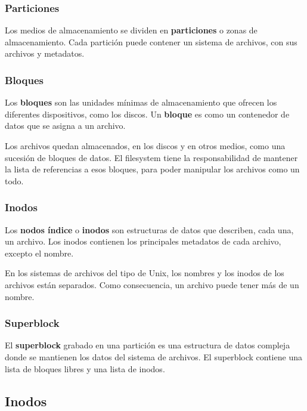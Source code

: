 \documentclass[spanish,a4paper,]{article}
\begin{document}
\hypertarget{particiones}{%
\subsubsection{Particiones}\label{particiones}}

Los medios de almacenamiento se dividen en \textbf{particiones} o zonas
de almacenamiento. Cada partición puede contener un sistema de archivos,
con sus archivos y metadatos.

\hypertarget{bloques}{%
\subsubsection{Bloques}\label{bloques}}

Los \textbf{bloques} son las unidades mínimas de almacenamiento que
ofrecen los diferentes dispositivos, como los discos. Un \textbf{bloque}
es como un contenedor de datos que se asigna a un archivo.

Los archivos quedan almacenados, en los discos y en otros medios, como
una sucesión de bloques de datos. El filesystem tiene la responsabilidad
de mantener la lista de referencias a esos bloques, para poder manipular
los archivos como un todo.

\hypertarget{inodos}{%
\subsubsection{Inodos}\label{inodos}}

Los \textbf{nodos índice} o \textbf{inodos} son estructuras de datos que
describen, cada una, un archivo. Los inodos contienen los principales
metadatos de cada archivo, excepto el nombre.

En los sistemas de archivos del tipo de Unix, los nombres y los inodos
de los archivos están separados. Como consecuencia, un archivo puede
tener más de un nombre.

\hypertarget{superblock}{%
\subsubsection{Superblock}\label{superblock}}

El \textbf{superblock} grabado en una partición es una estructura de
datos compleja donde se mantienen los datos del sistema de archivos. El
superblock contiene una lista de bloques libres y una lista de inodos.

\hypertarget{inodos-1}{%
\subsection{Inodos}\label{inodos-1}}
\end{document}
